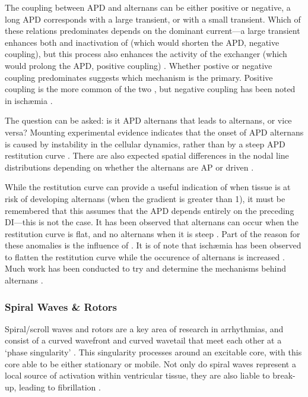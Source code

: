 \documentclass[../thesis-main.tex]{subfiles}
\begin{document}
The coupling between APD and \ca{} alternans can be either positive or negative, \idest{} a long APD corresponds with a large \cai{} transient, or with a small \cai{} transient. Which of these relations predominates depends on the dominant current---a large \cai{} transient enhances both \iks{} and inactivation of \ica{} (which would shorten the APD, \idest{} negative coupling), but this process also enhances the activity of the exchanger \inaca{} (which would prolong the APD, \idest{} positive coupling) \citep{Shiferaw2005}. Whether postive or negative coupling predominates suggests which mechanism is the primary. Positive coupling is the more common of the two \citep{Laurita2008}, but negative coupling has been noted in isch\ae{}mia \citep{Lee1988}.

The question can be asked: is it APD alternans that leads to \ca{} alternans, or vice versa? Mounting experimental evidence indicates that the onset of APD alternans is caused by instability in the cellular \cai{} dynamics, rather than by a steep APD restitution curve \citep{Goldhaber2005, Pruvot2004}. There are also expected spatial differences in the nodal line distributions depending on whether the alternans are AP or \ca{} driven \citep{Weiss2006}.

While the restitution curve can provide a useful indication of when tissue is at risk of developing alternans (when the gradient is greater than 1), it must be remembered that this assumes that the APD depends entirely on the preceding DI---this is not the case. It has been observed that alternans can occur when the restitution curve is flat, and no alternans when it is steep \citep{Shiferaw2005}. Part of the reason for these anomalies is the influence of \cai{}. It is of note that isch\ae{}mia has been observed to flatten the restitution curve \citep{Taggart1996} while the occurence of alternans is increased \citep{Qian2001}. Much work has been conducted to try and determine the mechanisms behind \ca{} alternans \citep{Shiferaw2003, Weiss2006}.

\subsubsection{Spiral Waves \& Rotors}
\label{subsubsec:spiralWaves-rotors}
Spiral/scroll waves and rotors are a key area of research in arrhythmias, and consist of a curved wavefront and curved wavetail that meet each other at a `phase singularity' \citep{Fitzhugh1960, Fitzhugh1961, Gray1998}. This singularity processes around an excitable core, with this core able to be either stationary or mobile. Not only do spiral waves represent a local source of activation within ventricular tissue, they are also liable to break-up, leading to fibrillation \citep{Riccio1999}.
\end{document}
